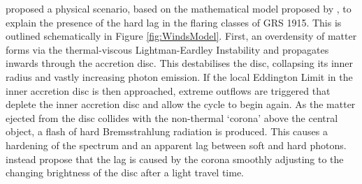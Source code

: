 \par \citet{Neilsen_GRSModel} proposed a physical scenario, based on the mathematical model proposed by \citet{Nayakshin_GRSModel}, to explain the presence of the hard lag in the flaring classes of GRS 1915.  This is outlined schematically in Figure \ref{fig:WindsModel}.  First, an overdensity of matter forms via the thermal-viscous Lightman-Eardley Instability \citep{Lightman_Instability} and propagates inwards through the accretion disc.  This destabilises the disc, collapsing its inner radius and vastly increasing photon emission.  If the local Eddington Limit in the inner accretion disc is then approached, extreme outflows are triggered that deplete the inner accretion disc and allow the cycle to begin again.  As the matter ejected from the disc collides with the non-thermal `corona' above the central object, a flash of hard Bremsstrahlung radiation is produced.  This causes a hardening of the spectrum and an apparent lag between soft and hard photons.  \citet{Janiuk_Lag} instead propose that the lag is caused by the corona smoothly adjusting to the changing brightness of the disc after a light travel time.


